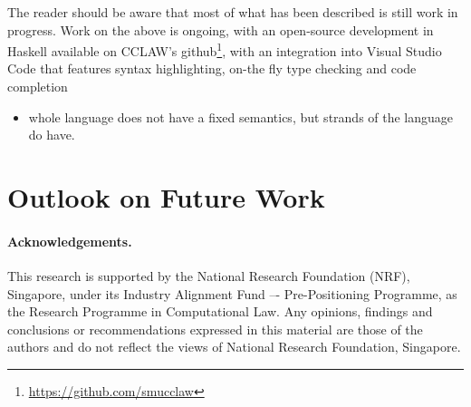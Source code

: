 \documentclass[runningheads]{llncs}
\begin{document}
The reader should be aware that most of what has been described is still work
in progress. Work on the above is ongoing, with an open-source development in
Haskell available on CCLAW's
github\footnote{\url{https://github.com/smucclaw}}, with an integration into
Visual Studio Code that features syntax highlighting, on-the fly type checking
and code completion 

\begin{itemize}
\item whole language does not have a fixed semantics, but strands of the
  language do have.
\end{itemize}

\section{Outlook on Future Work}\label{sec:outlook}



\paragraph{Acknowledgements.}
This research is supported by the National Research Foundation (NRF),
Singapore, under its Industry Alignment Fund –- Pre-Positioning Programme, as
the Research Programme in Computational Law. Any opinions, findings and
conclusions or recommendations expressed in this material are those of the
authors and do not reflect the views of National Research Foundation,
Singapore.

% 
% 


\end{document}
